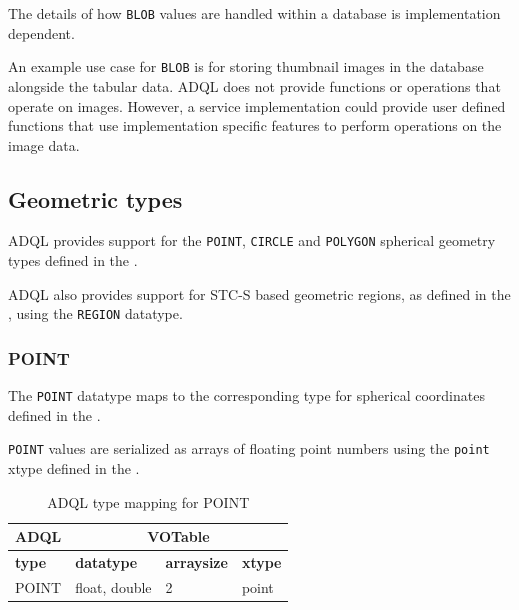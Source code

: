 \documentclass[11pt,a4paper]{ivoa}
\begin{document}
The details of how \verb:BLOB: values are handled within a
database is implementation dependent.

An example use case for \verb:BLOB: is for storing thumbnail images
in the database alongside the tabular data.
ADQL does not provide functions or operations that operate on
images.
However, a service implementation could provide user defined
functions that use implementation specific features to perform
operations on the image data.

\subsection{Geometric types}
\label{sec:types.geom}

ADQL provides support for the \verb:POINT:, \verb:CIRCLE: and \verb:POLYGON:
spherical geometry types defined in the \DALISpec{}.

ADQL also provides support for STC-S based geometric regions,
as defined in the \STCSSpec{}, using the \verb:REGION: datatype.

\subsubsection{POINT}
\label{sec:types.geom.point}

The \verb:POINT: datatype maps to the corresponding type
for spherical coordinates defined in the
\DALISpec{}.

\verb:POINT: values are serialized as arrays of floating point numbers
using the \verb:point: xtype defined in the \DALISpec{}.

\begin{table}[th]\footnotesize
    \begin{tabular}
        {|p{}|p{}|p{}|p{}|}
        
        \hline
        \multicolumn{1}{|c|}{\textbf{ADQL}} &
        \multicolumn{3}{|c|}{\textbf{VOTable}}
        \tabularnewline
        
        \hline
        \textbf{type} &
        \textbf{datatype} &
        \textbf{arraysize} &
        \textbf{xtype}
        \tabularnewline

        \hline
        POINT &
        float, double &
        2 &
        point
        \tabularnewline
        \hline
    \end{tabular}
    \caption{ADQL type mapping for POINT}
    \label{table:types.geom.point}
\end{table}
\end{document}
